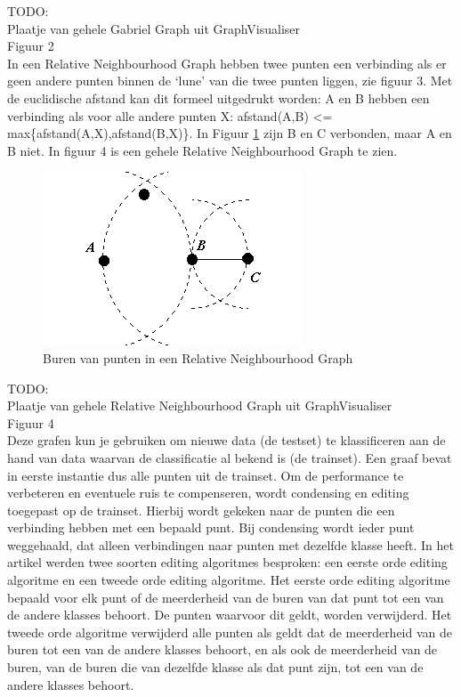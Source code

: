 \documentclass{article}
\begin{document}
TODO: \\
Plaatje van gehele Gabriel Graph uit GraphVisualiser\\
Figuur  2\\

In een Relative Neighbourhood Graph hebben twee punten een verbinding als er geen andere punten binnen de ‘lune’ van die twee punten liggen, zie figuur 3. Met de euclidische afstand kan dit formeel uitgedrukt worden: A en B hebben een verbinding als voor alle andere punten X:  afstand(A,B) <= max\{afstand(A,X),afstand(B,X)\}. In Figuur \ref{RNGburen} zijn B en C  verbonden, maar A en B niet. In figuur 4 is een gehele Relative Neighbourhood Graph te zien.\\

\begin{figure}[h!]
    \centering
        \includegraphics[scale=1, page=1]{RNGburen}
    \caption{Buren van punten in een Relative Neighbourhood Graph}
    \label{RNGburen}
\end{figure}

TODO: \\
Plaatje van gehele Relative Neighbourhood Graph uit GraphVisualiser\\
Figuur 4\\

Deze grafen kun je gebruiken om nieuwe data (de testset) te klassificeren aan de hand van data waarvan de classificatie al bekend is (de trainset). Een graaf bevat in eerste instantie dus alle punten uit de trainset. Om de performance te verbeteren en eventuele ruis te compenseren, wordt condensing en editing toegepast op de trainset. Hierbij wordt gekeken naar de punten die een verbinding hebben met een bepaald punt. Bij condensing wordt ieder punt weggehaald, dat alleen verbindingen naar punten met dezelfde klasse heeft. 
In het artikel werden twee soorten editing algoritmes besproken: een eerste orde editing algoritme en een tweede orde editing algoritme. 
Het eerste orde editing algoritme bepaald voor elk punt of de meerderheid van de buren van dat punt tot een van de andere klasses behoort. De punten waarvoor dit geldt, worden verwijderd. 
Het tweede orde algoritme verwijderd alle punten als geldt dat de meerderheid van de buren tot een van de andere klasses behoort, en als ook de meerderheid van de buren, van de buren die van dezelfde klasse als dat punt zijn, tot een van de andere klasses behoort.\\
\end{document}
